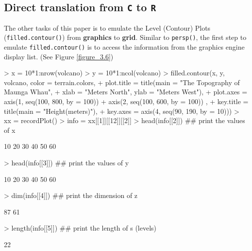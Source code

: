 \documentclass[11pt]{report}
\begin{document}
\subsection{Direct translation from \texttt{C} to \texttt{R}}
The other tasks of this paper is to emulate the Level (Contour) Plots (\texttt{filled.contour()}) from \textbf{graphics} to \textbf{grid}. Similar to \texttt{persp()}, the first step to emulate \texttt{filled.contour()} is to access the information from the graphics engine display list. (See Figure \ref{figure_3.6})
\begin{Schunk}
\begin{Sinput}
> x = 10*1:nrow(volcano)
> y = 10*1:ncol(volcano)
> filled.contour(x, y, volcano, color = terrain.colors,
+               plot.title = title(main = "The Topography of Maunga Whau",
+               xlab = "Meters North", ylab = "Meters West"),
+               plot.axes = { axis(1, seq(100, 800, by = 100))
+               axis(2, seq(100, 600, by = 100)) },
+               key.title = title(main = "Height\n(meters)"),
+               key.axes = axis(4, seq(90, 190, by = 10)))
> xx = recordPlot()
> info = xx[[1]][[12]][[2]]
> head(info[[2]])  ## print the values of x
\end{Sinput}
\begin{Soutput}
[1] 10 20 30 40 50 60
\end{Soutput}
\begin{Sinput}
> head(info[[3]])  ## print the values of y
\end{Sinput}
\begin{Soutput}
[1] 10 20 30 40 50 60
\end{Soutput}
\begin{Sinput}
> dim(info[[4]])  ## print the dimension of z
\end{Sinput}
\begin{Soutput}
[1] 87 61
\end{Soutput}
\begin{Sinput}
> length(info[[5]])  ## print the length of s (levels)
\end{Sinput}
\begin{Soutput}
[1] 22
\end{Soutput}
\end{Schunk}
\end{document}
